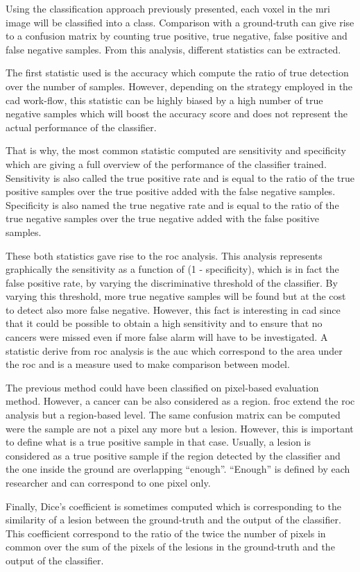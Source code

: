 Using the classification approach previously presented, each voxel in the \ac{mri} image will be classified into a class. Comparison with a ground-truth can give rise to a confusion matrix by counting true positive, true negative, false positive and false negative samples. From this analysis, different statistics can be extracted. 

The first statistic used is the accuracy which compute the ratio of true detection over the number of samples. However, depending on the strategy employed in the \ac{cad} work-flow, this statistic can be highly biased by a high number of true negative samples which will boost the accuracy score and does not represent the actual performance of the classifier.

That is why, the most common statistic computed are sensitivity and specificity which are giving a full overview of the performance of the classifier trained. Sensitivity is also called the true positive rate and is equal to the ratio of the true positive samples over the true positive added with the false negative samples. Specificity is also named the true negative rate and is equal to the ratio of the true negative samples over the true negative added with the false positive samples.

These both statistics gave rise to the \acf{roc} analysis. This analysis represents graphically the sensitivity as a function of (1 - specificity), which is in fact the false positive rate, by varying the discriminative threshold of the classifier. By varying this threshold, more true negative samples will be found but at the cost to detect also more false negative. However, this fact is interesting in \ac{cad} since that it could be possible to obtain a high sensitivity and to ensure that no cancers were missed even if more false alarm will have to be investigated. A statistic derive from \ac{roc} analysis is the \acf{auc} which correspond to the area under the \ac{roc} and is a measure used to make comparison between model. 

The previous method could have been classified on pixel-based evaluation method. However, a cancer can be also considered as a region. \acf{froc} extend the \ac{roc} analysis but a region-based level. The same confusion matrix can be computed were the sample are not a pixel any more but a lesion. However, this is important to define what is a true positive sample in that case. Usually, a lesion is considered as a true positive sample if the region detected by the classifier and the one inside the ground are overlapping ``enough''. ``Enough'' is defined by each researcher and can correspond to one pixel only.

Finally, Dice's coefficient is sometimes computed which is corresponding to the similarity of a lesion between the ground-truth and the output of the classifier. This coefficient correspond to the ratio of the twice the number of pixels in common over the sum of the pixels of the lesions in the ground-truth and the output of the classifier.